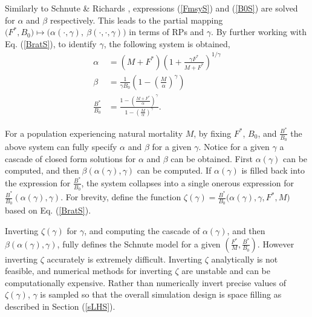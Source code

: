 %
Similarly to Schnute \& Richards \cite{schnute_analytical_1998}, expressions %
(\ref{FmsyS}) and (\ref{B0S}) are solved for $\alpha$ and $\beta$ respectively.
This leads to the partial mapping 
$\big(F^*, B_0\big) \mapsto \big(\alpha(\cdot, \gamma), ~\beta(\cdot, \cdot, \gamma)\big)$ 
in terms of RPs and $\gamma$. 
By further working with Eq. (\ref{BratS}), to identify $\gamma$, the following
system is obtained,
%
\begin{align}
\alpha &= (M+F^*)\left(1+\frac{\gamma F^*}{M+F^*}\right)^{1/\gamma} \nonumber\\
\beta &= \frac{1}{\gamma B_0}\left(1-\left(\frac{M}{\alpha}\right)^\gamma\right) \label{abgSys}\\
\frac{B^*}{B_0} &= \frac{1-\left(\frac{M+F^*}{\alpha}\right)^\gamma}{ 1-\left(\frac{M}{\alpha}\right)^\gamma } \nonumber.
\end{align}

%
For a population experiencing natural mortality $M$, by fixing $F^*$, 
$B_0$, and $\frac{B^*}{B_0}$ %
the above system can fully specify $\alpha$ and $\beta$ for a given $\gamma$. %
Notice for a given $\gamma$ a cascade of closed form solutions for $\alpha$
and $\beta$ can be obtained. First $\alpha(\gamma)$ can be computed, and then
$\beta(\alpha(\gamma), \gamma)$ can be computed. If $\alpha(\gamma)$ is filled
back into the expression for $\frac{B^*}{B_0}$, the system collapses into
a single onerous expression for $\frac{B^*}{B_0}(\alpha(\gamma), \gamma)$.
For brevity, define the function \mbox{$\zeta(\gamma)=\frac{B^*}{B_0}\big(\alpha(\gamma), \gamma, F^*, M\big)$} based on Eq. (\ref{BratS}). 

Inverting $\zeta(\gamma)$ for $\gamma$, and computing the cascade of
$\alpha(\gamma)$, and then $\beta(\alpha(\gamma), \gamma)$, fully defines the
Schnute model for a given $(\frac{F^*}{M}, \frac{B^*}{B_0})$. However
inverting $\zeta$ accurately is extremely difficult. Inverting $\zeta$
analytically is not feasible, and numerical methods for inverting
$\zeta$ are unstable and can be computationally expensive.
%
Rather than numerically invert precise values of $\zeta(\gamma)$, $\gamma$ is 
sampled so that the overall simulation design is space filling as described in 
Section (\ref{sLHS}).

